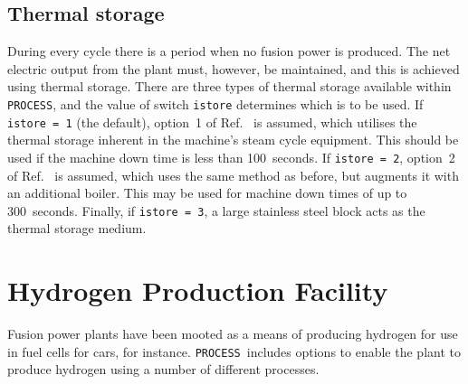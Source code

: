 \documentclass[11pt,a4paper]{report}
\newcommand{\process}{\mbox{\texttt{PROCESS}}}
\begin{document}
\subsection{Thermal storage}

During every cycle there is a period when no fusion power is produced. The net
electric output from the plant must, however, be maintained, and this is
achieved using thermal storage. There are three types of thermal storage
available within \process, and the value of switch \texttt{istore} determines
which is to be used. If \texttt{istore = 1} (the default), option~1 of
Ref.~\cite{ELECTROWATT} is assumed, which utilises the thermal storage
inherent in the machine's steam cycle equipment. This should be used if the
machine down time is less than 100~seconds. If \texttt{istore = 2}, option~2
of Ref.~\cite{ELECTROWATT} is assumed, which uses the same method as before,
but augments it with an additional boiler. This may be used for machine down
times of up to 300~seconds. Finally, if \texttt{istore = 3}, a large stainless
steel block acts as the thermal storage medium.

\section{Hydrogen Production Facility}
\label{sec:hplant}

Fusion power plants have been mooted as a means of producing hydrogen for use
in fuel cells for cars, for instance. \process\ includes options to enable
the plant to produce hydrogen using a number of different processes.
\end{document}
